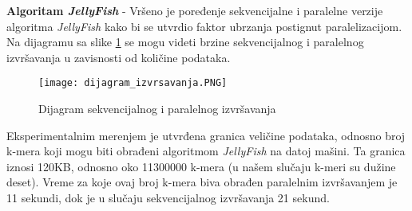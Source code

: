 \documentclass[12pt,oneside]{memoir}
\begin{document}
\textbf{Algoritam \textit{JellyFish}} - Vršeno je poređenje sekvencijalne i paralelne verzije algoritma \textit{JellyFish} kako bi se utvrdio faktor ubrzanja postignut paralelizacijom. Na dijagramu sa slike \ref{fig:dijagramIzvrsavanja} se mogu videti brzine sekvencijalnog i paralelnog izvršavanja u zavisnosti od količine podataka. 

\begin{figure}[!ht]
  \centering
  \texttt{[image: dijagram\_izvrsavanja.PNG]}
  \caption{Dijagram sekvencijalnog i paralelnog izvršavanja}
  \label{fig:dijagramIzvrsavanja}
\end{figure}

Eksperimentalnim merenjem je utvrđena granica veličine podataka, odnosno broj k-mera koji mogu biti obrađeni algoritmom \textit{JellyFish} na datoj mašini. Ta granica iznosi 120KB, odnosno oko 11300000 k-mera (u našem slučaju k-meri su dužine deset). Vreme za koje ovaj broj k-mera biva obrađen paralelnim izvršavanjem je 11 sekundi, dok je u slučaju sekvencijalnog izvršavanja 21 sekund.

\end{document}
